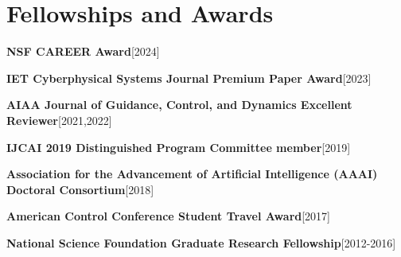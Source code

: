 \documentclass[10pt,roman]{moderncv}
\newcommand{\mycvitem}[2]{
    \textbf{#2}\hfill [#1]\break
}
\begin{document}
\section{Fellowships and Awards}

\mycvitem{2024}{NSF CAREER Award}
\mycvitem{2023}{IET Cyberphysical Systems Journal Premium Paper Award}
\mycvitem{2021,2022}{AIAA Journal of Guidance, Control, and Dynamics Excellent Reviewer}
\mycvitem{2019}{IJCAI 2019 Distinguished Program Committee member}
\mycvitem{2018}{Association for the Advancement of Artificial Intelligence (AAAI) Doctoral Consortium}
\mycvitem{2017}{American Control Conference Student Travel Award}
\mycvitem{2012-2016}{National Science Foundation Graduate Research Fellowship}
\end{document}
